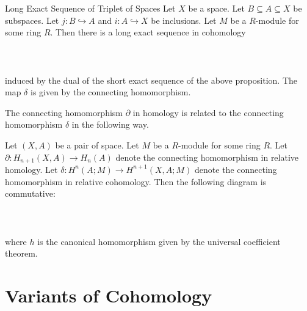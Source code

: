 \documentclass[a4paper]{article}
\begin{document}
\begin{thm}{Long Exact Sequence of Triplet of Spaces}{} Let $X$ be a space. Let $B\subseteq A\subseteq X$ be subspaces. Let $j:B\hookrightarrow A$ and $i:A\hookrightarrow X$ be inclusions. Let $M$ be a $R$-module for some ring $R$. Then there is a long exact sequence in cohomology \\~\\
\\~\\
induced by the dual of the short exact sequence of the above proposition. The map $\delta$ is given by the connecting homomorphism. 
\end{thm}

The connecting homomorphism $\partial$ in homology is related to the connecting homomorphism $\delta$ in the following way. 

\begin{prp}{}{} Let $(X,A)$ be a pair of space. Let $M$ be a $R$-module for some ring $R$. Let $\partial:H_{n+1}(X,A)\to H_n(A)$ denote the connecting homomorphism in relative homology. Let $\delta:H^n(A;M)\to H^{n+1}(X,A;M)$ denote the connecting homomorphism in relative cohomology. Then the following diagram is commutative: \\~\\
\\~\\
where $h$ is the canonical homomorphism given by the universal coefficient theorem. 
\end{prp}

\pagebreak
\section{Variants of Cohomology}
\end{document}
